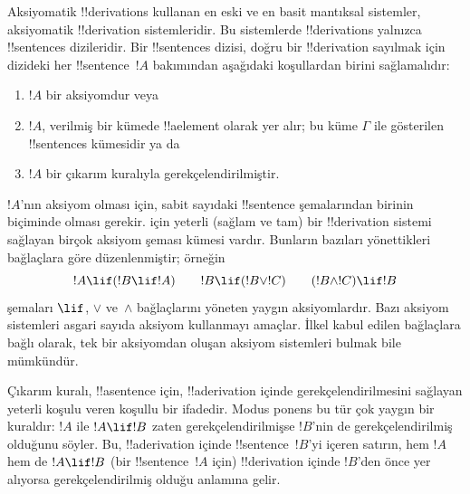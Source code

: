 

      {}
      {}


Aksiyomatik !!{derivation}s kullanan en eski ve en basit mantıksal sistemler,
aksiyomatik !!{derivation} sistemleridir. Bu sistemlerde !!{derivation}s
yalnızca !!{sentence}s dizileridir. Bir !!{sentence}s dizisi, doğru bir
!!{derivation} sayılmak için dizideki her !!{sentence}~$!A$ bakımından
aşağıdaki koşullardan birini sağlamalıdır:
\begin{enumerate}
\item $!A$ bir aksiyomdur veya
\item $!A$, verilmiş bir kümede !!a{element} olarak yer alır; bu küme $\Gamma$ ile
  gösterilen !!{sentence}s kümesidir ya da
\item $!A$ bir çıkarım kuralıyla gerekçelendirilmiştir.
\end{enumerate}
$!A$'nın aksiyom olması için, sabit sayıdaki !!{sentence} şemalarından birinin
biçiminde olması gerekir. 
için yeterli (sağlam ve
tam) bir !!{derivation} sistemi sağlayan birçok aksiyom şeması kümesi vardır.
Bunların bazıları yönettikleri bağlaçlara göre düzenlenmiştir; örneğin
\[
!A \lif (!B \lif !A) \qquad !B \lif (!B \lor !C) \qquad (!B \land !C) \lif !B
\]
şemaları $\lif$, $\lor$ ve~$\land$ bağlaçlarını yöneten yaygın aksiyomlardır.
Bazı aksiyom sistemleri asgari sayıda aksiyom kullanmayı amaçlar. İlkel kabul
edilen bağlaçlara bağlı olarak, tek bir aksiyomdan oluşan aksiyom sistemleri
bulmak bile mümkündür.

Çıkarım kuralı, !!a{sentence} için, !!a{derivation} içinde
gerekçelendirilmesini sağlayan yeterli koşulu veren koşullu bir ifadedir.
Modus ponens bu tür çok yaygın
bir kuraldır: $!A$ ile $!A \lif !B$ zaten gerekçelendirilmişse $!B$'nin de
gerekçelendirilmiş olduğunu söyler. Bu, !!a{derivation} içinde
!!{sentence}~$!B$'yi içeren satırın, hem $!A$ hem de $!A \lif !B$ (bir
!!{sentence}~$!A$ için) !!{derivation} içinde $!B$'den önce yer alıyorsa
gerekçelendirilmiş olduğu anlamına gelir.

